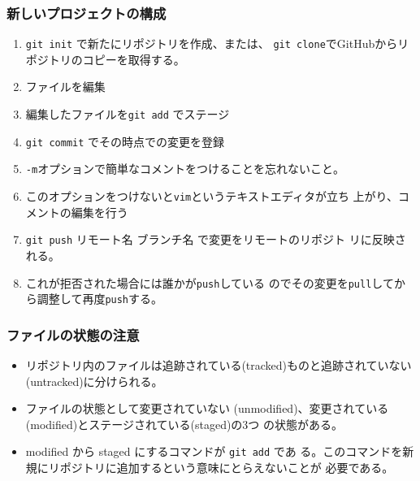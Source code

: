 \begin{frame}[containsverbatim]
 \frametitle{新しいプロジェクトの構成}
\begin{enumerate}
 \item \Verb+git init+ で新たにリポジトリを作成、または、
			 \Verb+git clone+でGitHubからリポジトリのコピーを取得する。
 \item ファイルを編集
 \item 編集したファイルを\Verb+git add+ でステージ
 \item \Verb+git commit+ でその時点での変更を登録
 \item \Verb+-m+オプションで簡単なコメントをつけることを忘れないこと。
 \item このオプションをつけないと\Verb+vim+というテキストエディタが立ち
       上がり、コメントの編集を行う
 \item \Verb+git push+ リモート名 ブランチ名 で変更をリモートのリポジト
			 リに反映される。
 \item これが拒否された場合には誰かが\Verb+push+している
			 のでその変更を\Verb+pull+してから調整して再度\Verb+push+する。
\end{enumerate}
\end{frame}
\begin{frame}[containsverbatim]
 \frametitle{ファイルの状態の注意}
\begin{itemize}
 \item リポジトリ内のファイルは追跡されている(tracked)ものと追跡されていない
(untracked)に分けられる。
 \item ファイルの状態として変更されていない
(unmodified)、変更されている(modified)とステージされている(staged)の3つ
の状態がある。
 \item modified から staged にするコマンドが \Verb+git add+ であ
る。このコマンドを新規にリポジトリに追加するという意味にとらえないことが
必要である。
\end{itemize}
\end{frame}
